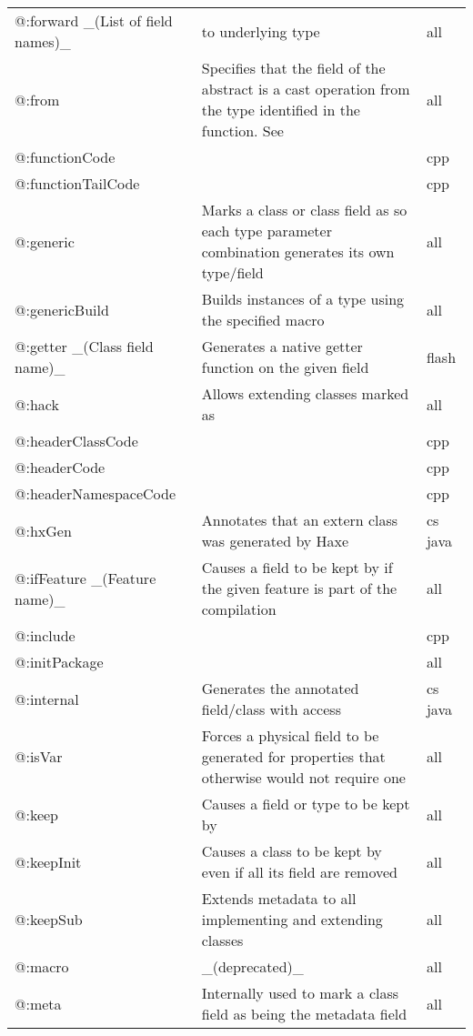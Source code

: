 \begin{center}
\begin{tabular}{| l | l | l |}
	@:forward \_(List of field names)\_  &  \tref{Forwards field access}{types-abstract-forward} to underlying type  &  all \\
	@:from   &  Specifies that the field of the abstract is a cast operation from the type identified in the function. See \tref{Implicit Casts}{types-abstract-implicit-casts}  &  all \\
	@:functionCode  &     &  cpp \\
	@:functionTailCode  &    &  cpp \\
	@:generic &  Marks a class or class field as \tref{generic}{type-system-generic} so each type parameter combination generates its own type/field  &  all \\
	@:genericBuild  &  Builds instances of a type using the specified macro   &  all \\
	@:getter \_(Class field name)\_  &  Generates a native getter function on the given field   &  flash \\
	@:hack   &  Allows extending classes marked as \expr{@:final}  &  all \\
	@:headerClassCode  &    &  cpp \\
	@:headerCode   &     &  cpp \\
	@:headerNamespaceCode  &    &  cpp \\
	@:hxGen  &  Annotates that an extern class was generated by Haxe  &  cs  java \\
	@:ifFeature \_(Feature name)\_  &  Causes a field to be kept by \tref{DCE}{cr-dce} if the given feature is part of the compilation  &  all \\
	@:include &     &  cpp \\
	@:initPackage  &    &  all \\
	@:internal  &  Generates the annotated field/class with \expr{internal} access  &  cs  java \\
	@:isVar  &  Forces a physical field to be generated for properties that otherwise would not require one  &  all \\
	@:keep   &  Causes a field or type to be kept by \tref{DCE}{cr-dce}  &  all \\
	@:keepInit  &  Causes a class to be kept by \tref{DCE}{cr-dce} even if all its field are removed  &  all \\
	@:keepSub &  Extends \expr{@:keep} metadata to all implementing and extending classes  &  all \\
	@:macro  &  \_(deprecated)\_  &  all \\
	@:meta   &  Internally used to mark a class field as being the metadata field  &  all \\

\end{tabular}
\end{center}
